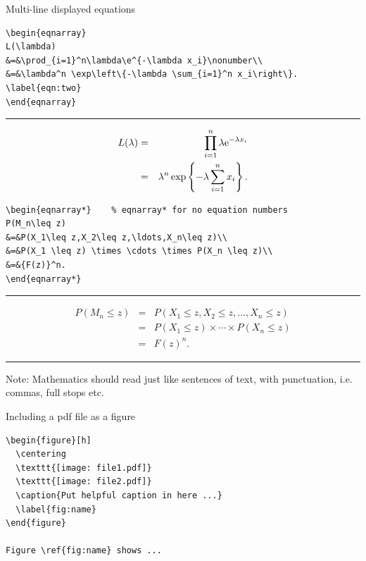 \documentclass{beamer}             %
\let\leq=\leqslant
\begin{document}
\begin{frame}[containsverbatim]{Multi-line displayed equations}

\begin{verbatim}
\begin{eqnarray}
L(\lambda)
&=&\prod_{i=1}^n\lambda\e^{-\lambda x_i}\nonumber\\
&=&\lambda^n \exp\left\{-\lambda \sum_{i=1}^n x_i\right\}.
\label{eqn:two}
\end{eqnarray}
\end{verbatim}

\vspace{.1cm}
\hrule
\vspace{.1cm}
\begin{eqnarray}
 L(\lambda) &=& \prod_{i=1}^n \lambda \e^{-\lambda x_i} \nonumber \\ %
 &=& \lambda^n \exp \left\{-\lambda \sum_{i=1}^n x_i \right\}. \label{eqn:two}%
\end{eqnarray}

\end{frame}

\begin{frame}[containsverbatim]
\begin{verbatim}
\begin{eqnarray*}    % eqnarray* for no equation numbers
P(M_n\leq z)
&=&P(X_1\leq z,X_2\leq z,\ldots,X_n\leq z)\\
&=&P(X_1 \leq z) \times \cdots \times P(X_n \leq z)\\
&=&{F(z)}^n.
\end{eqnarray*}
\end{verbatim}
\vspace{.1cm}
\hrule
\begin{eqnarray*}                         %
P(M_n \leq z)&=&P(X_1 \leq z,X_2 \leq z,...,X_n \leq z)  \\
    &=&P(X_1 \leq z)  \times \cdots \times P(X_n \leq z) \\
    &=&{F(z)}^n.
\end{eqnarray*}
\vspace{.05cm}
\hrule
\vspace{.15cm}
{Note: Mathematics should read just like sentences of text, with punctuation, i.e. commas, full stops etc.}
\end{frame}

\begin{frame}[containsverbatim]{Including a pdf file as a figure}

\begin{verbatim}
\begin{figure}[h]
  \centering
  \texttt{[image: file1.pdf]}
  \texttt{[image: file2.pdf]}
  \caption{Put helpful caption in here ...}
  \label{fig:name}
\end{figure}

Figure \ref{fig:name} shows ...
\end{verbatim}

\end{frame}
\end{document}
